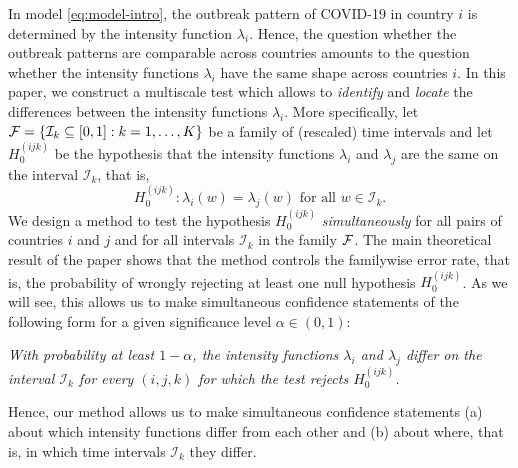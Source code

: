 \documentclass[a4paper,12pt]{article}
\numberwithin{equation}{section}
\begin{document}
In model \eqref{eq:model-intro}, the outbreak pattern of COVID-19 in country $i$ is determined by the intensity function $\lambda_i$. Hence, the question whether the outbreak patterns are comparable across countries amounts to the question whether the intensity functions $\lambda_i$ have the same shape across countries $i$. 
In this paper, we construct a multiscale test which allows to \textit{identify} and \textit{locate} the differences between the intensity functions $\lambda_i$. More specifically, let $\mathcal{F} = \{ \mathcal{I}_k \subseteq[0,1] : k = 1,\ldots,K \}$ be a family of (rescaled) time intervals and let $H_0^{(ijk)}$ be the hypothesis that the intensity functions $\lambda_i$ and $\lambda_j$ are the same on the interval $\mathcal{I}_k$, that is, 
\[ H_0^{(ijk)}: \lambda_i(w) = \lambda_j(w) \text{ for all } w \in \mathcal{I}_k. \]
We design a method to test the hypothesis $H_0^{(ijk)}$ \textit{simultaneously} for all pairs of countries $i$ and $j$ and for all intervals $\mathcal{I}_k$ in the family $\mathcal{F}$. The main theoretical result of the paper shows that the method controls the familywise error rate, that is, the probability of wrongly rejecting at least one null hypothesis $H_0^{(ijk)}$. As we will see, this allows us to make simultaneous confidence statements of the following form for a given significance level $\alpha \in (0,1)$: 
\begin{center}
\begin{minipage}[c][1.25cm][c]{13cm}
\textit{With probability at least $1-\alpha$, the intensity functions $\lambda_i$ and $\lambda_j$ differ on the interval $\mathcal{I}_k$ for every $(i,j,k)$ for which the test rejects $H_0^{(ijk)}$.} 
\end{minipage}
\end{center}
Hence, our method allows us to make simultaneous confidence statements (a) about which intensity functions differ from each other and (b) about where, that is, in which time intervals $\mathcal{I}_{k}$ they differ. 
\end{document}

